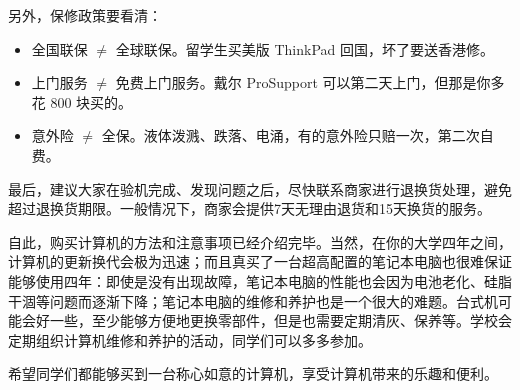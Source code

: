另外，保修政策要看清：
\begin{itemize}
  \item 全国联保 $\neq$ 全球联保。留学生买美版 ThinkPad 回国，坏了要送香港修。
  \item 上门服务 $\neq$ 免费上门服务。戴尔 ProSupport 可以第二天上门，但那是你多花 800 块买的。
  \item 意外险 $\neq$ 全保。液体泼溅、跌落、电涌，有的意外险只赔一次，第二次自费。
\end{itemize}
最后，建议大家在验机完成、发现问题之后，尽快联系商家进行退换货处理，避免超过退换货期限。一般情况下，商家会提供7天无理由退货和15天换货的服务。

自此，购买计算机的方法和注意事项已经介绍完毕。当然，在你的大学四年之间，计算机的更新换代会极为迅速；而且真买了一台超高配置的笔记本电脑也很难保证能够使用四年：即使是没有出现故障，笔记本电脑的性能也会因为电池老化、硅脂干涸等问题而逐渐下降；笔记本电脑的维修和养护也是一个很大的难题。台式机可能会好一些，至少能够方便地更换零部件，但是也需要定期清灰、保养等。学校会定期组织计算机维修和养护的活动，同学们可以多多参加。

希望同学们都能够买到一台称心如意的计算机，享受计算机带来的乐趣和便利。